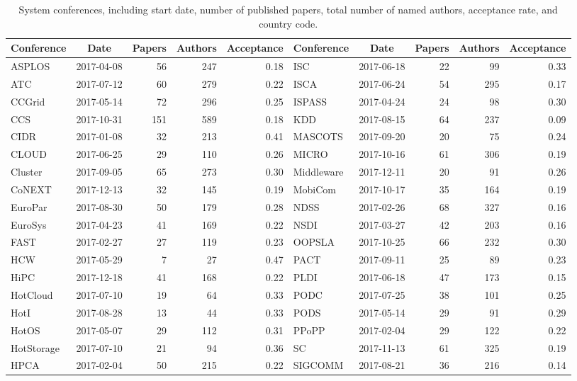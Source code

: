 \documentclass[12pt]{article}
\begin{document}
\begin{table}

\caption{\label{tab:sys-confs}System conferences, including start date, number of published papers, total number of named authors, acceptance rate, and country code.}
\centering
\fontsize{8}{10}\selectfont
\begin{tabular}[t]{|lcrrr||lcrrr|}
\toprule
Conference & Date & Papers & Authors & Acceptance & Conference & Date & Papers & Authors & Acceptance\\
\midrule
ASPLOS & 2017-04-08 & 56 & 247 & 0.18 & ISC & 2017-06-18 & 22 & 99 & 0.33\\
ATC & 2017-07-12 & 60 & 279 & 0.22 & ISCA & 2017-06-24 & 54 & 295 & 0.17\\
CCGrid & 2017-05-14 & 72 & 296 & 0.25 & ISPASS & 2017-04-24 & 24 & 98 & 0.30\\
CCS & 2017-10-31 & 151 & 589 & 0.18 & KDD & 2017-08-15 & 64 & 237 & 0.09\\
CIDR & 2017-01-08 & 32 & 213 & 0.41 & MASCOTS & 2017-09-20 & 20 & 75 & 0.24\\
CLOUD & 2017-06-25 & 29 & 110 & 0.26 & MICRO & 2017-10-16 & 61 & 306 & 0.19\\
Cluster & 2017-09-05 & 65 & 273 & 0.30 & Middleware & 2017-12-11 & 20 & 91 & 0.26\\
CoNEXT & 2017-12-13 & 32 & 145 & 0.19 & MobiCom & 2017-10-17 & 35 & 164 & 0.19\\
EuroPar & 2017-08-30 & 50 & 179 & 0.28 & NDSS & 2017-02-26 & 68 & 327 & 0.16\\
EuroSys & 2017-04-23 & 41 & 169 & 0.22 & NSDI & 2017-03-27 & 42 & 203 & 0.16\\
FAST & 2017-02-27 & 27 & 119 & 0.23 & OOPSLA & 2017-10-25 & 66 & 232 & 0.30\\
HCW & 2017-05-29 & 7 & 27 & 0.47 & PACT & 2017-09-11 & 25 & 89 & 0.23\\
HiPC & 2017-12-18 & 41 & 168 & 0.22 & PLDI & 2017-06-18 & 47 & 173 & 0.15\\
HotCloud & 2017-07-10 & 19 & 64 & 0.33 & PODC & 2017-07-25 & 38 & 101 & 0.25\\
HotI & 2017-08-28 & 13 & 44 & 0.33 & PODS & 2017-05-14 & 29 & 91 & 0.29\\
HotOS & 2017-05-07 & 29 & 112 & 0.31 & PPoPP & 2017-02-04 & 29 & 122 & 0.22\\
HotStorage & 2017-07-10 & 21 & 94 & 0.36 & SC & 2017-11-13 & 61 & 325 & 0.19\\
HPCA & 2017-02-04 & 50 & 215 & 0.22 & SIGCOMM & 2017-08-21 & 36 & 216 & 0.14\\

\end{tabular}
\end{table}
\end{document}
